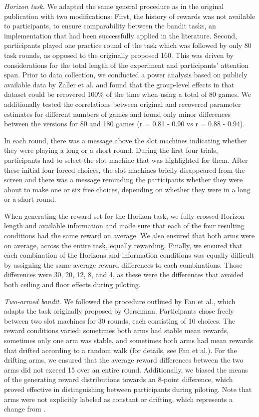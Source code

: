 \documentclass[fleqn,10pt]{wlscirep}
\begin{document}
\textit{Horizon task.} We adapted the same general procedure as in the original publication \cite{wilson_humans_2014} with two modifications: First, the history of rewards was not available to participants, to ensure comparability between the bandit tasks, an implementation that had been successfully applied in the literature\cite{cogliati_dezza_should_2019}. Second, participants played one practice round of the task which was followed by only 80 task rounds, as opposed to the originally proposed 160. This was driven by considerations for the total length of the experiment and participants' attention span. Prior to data collection, we conducted a power analysis based on publicly available data by Zaller et al.\cite{zaller_information_2021} and found that the group-level effects in that dataset could be recovered 100\% of the time when using a total of 80 games. We additionally tested the correlations between original and recovered parameter estimates for different numbers of games and found only minor differences between the versions for 80 and 180 games (r = 0.81 - 0.90 vs r = 0.88 - 0.94). 

In each round, there was a message above the slot machines indicating whether they were playing a long or a short round. During the first four trials, participants had to select the slot machine that was highlighted for them. After these initial four forced choices, the slot machines briefly disappeared from the screen and there was a message reminding the participants whether they were about to make one or six free choices, depending on whether they were in a long or a short round.

When generating the reward set for the Horizon task, we fully crossed Horizon length and available information and made sure that each of the four resulting conditions had the same reward on average. We also ensured that both arms were on average, across the entire task, equally rewarding. Finally, we ensured that each combination of the Horizons and information conditions was equally difficult by assigning the same average reward differences to each combinations. Those differences were 30, 20, 12, 8, and 4, as these were the differences that avoided both ceiling and floor effects during piloting.

\noindent \textit{Two-armed bandit.} 
We followed the procedure outlined by Fan et al.\cite{fan_trait_2023}, which adapts the task originally proposed by Gershman\cite{gershman_deconstructing_2018}. Participants chose freely between two slot machines for 30 rounds, each consisting of 10 choices. The reward conditions varied: sometimes both arms had stable mean rewards, sometimes only one arm was stable, and sometimes both arms had mean rewards that drifted according to a random walk (for details, see Fan et al.\cite{fan_trait_2023}). For the drifting arms, we ensured that the average reward differences between the two arms did not exceed 15 over an entire round. Additionally, we biased the means of the generating reward distributions towards an 8-point difference, which proved effective in distinguishing between participants during piloting. Note that arms were not explicitly labeled as constant or drifting, which represents a change from \cite{fan_trait_2023}.
\end{document}
